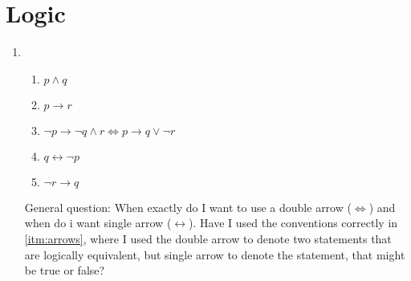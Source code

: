 \documentclass{article}
\begin{document}
\section{Logic}

\begin{enumerate}
    \item
        \begin{enumerate}
            \item $ p \land q $
            \item $ p \to r $
            \item \label{itm:arrows} $ \lnot p \to \lnot q \land r \Leftrightarrow p \to q \lor \lnot r $
            \item $ q \leftrightarrow \lnot p $
            \item $ \lnot r \to q $
        \end{enumerate}
        General question: When exactly do I want to use a double arrow
        ($\Leftrightarrow$) and when do i want single arrow
        ($\leftrightarrow$). Have I used the conventions correctly in
        \ref{itm:arrows}, where I used the double arrow to denote two
        statements that are logically equivalent, but single arrow to denote
        the statement, that might be true or false?
\end{enumerate}
\end{document}

